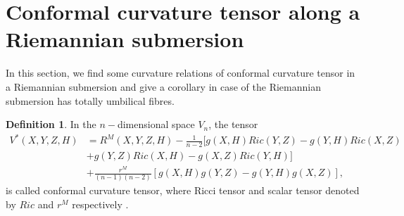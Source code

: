\documentclass{birkjour}
\theoremstyle{definition}
\newtheorem{definition}[theorem]{Definition}
\theoremstyle{remark}
\numberwithin{equation}{section}
\begin{document}
\section{Conformal curvature tensor along a Riemannian submersion}
In this section, we find some curvature relations of conformal curvature tensor in a Riemannian submersion and give a corollary in case of the Riemannian submersion has totally umbilical fibres.
\begin{definition}\rm \label{def1}
	In the $n-$dimensional space $V_n$, the tensor
	\begin{align*}
		V^*(X,Y,Z,H)&=R^M(X,Y,Z,H)-\frac{1}{n-2} [g(X,H)Ric(Y,Z)-g(Y,H)Ric(X,Z)\\
		&+g(Y,Z)Ric(X,H)-g(X,Z)Ric(Y,H)]\\
		&+\frac{r^M}{(n-1)(n-2)} [g(X,H)g(Y,Z)-g(Y,H)g(X,Z)],
	\end{align*}
	is called conformal curvature tensor, where Ricci tensor and scalar tensor denoted by $Ric$ and $r^M$  respectively \cite{mishra}.
\end{definition}
\end{document}
